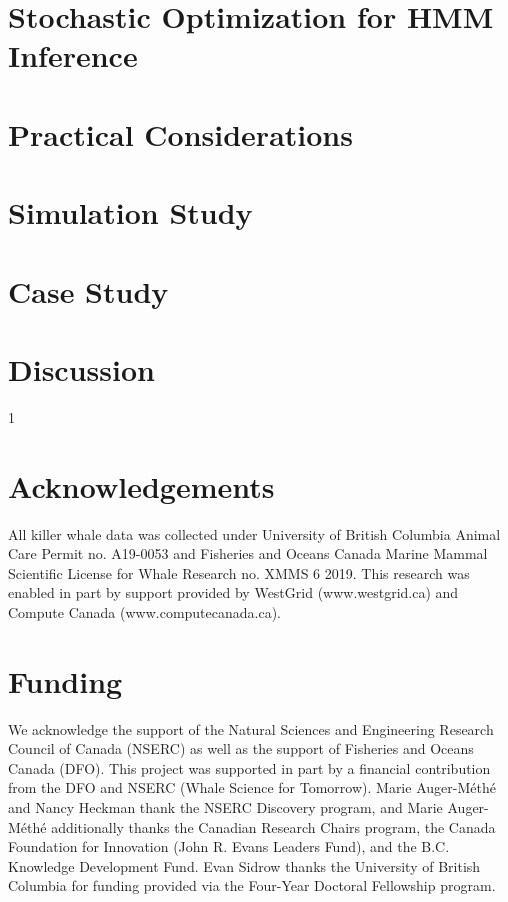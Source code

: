 \documentclass[12pt]{article}
\newcommand{\blind}{1}
\begin{document}
\section{Stochastic Optimization for HMM Inference}


\section{Practical Considerations}

\label{sec:prac}

\section{Simulation Study}


\section{Case Study}


\section{Discussion}


\blind
\section*{Acknowledgements}
All killer whale data was collected under University of British Columbia Animal Care Permit no. A19-0053 and Fisheries and Oceans Canada Marine Mammal Scientific License for Whale Research no. XMMS 6 2019.
This research was enabled in part by support provided by WestGrid (www.westgrid.ca) and Compute Canada (www.computecanada.ca).

\section*{Funding}
We acknowledge the support of the Natural Sciences and Engineering Research Council of Canada (NSERC) as well as the support of Fisheries and Oceans Canada (DFO). This project was supported in part by a financial contribution from the DFO and NSERC (Whale Science for Tomorrow).
Marie Auger-M\'eth\'e and Nancy Heckman thank the NSERC Discovery program, and Marie Auger-M\'eth\'e additionally thanks the Canadian Research Chairs program, the Canada Foundation for Innovation (John R. Evans Leaders Fund), and the B.C. Knowledge Development Fund.
Evan Sidrow thanks the University of British Columbia for funding provided via the Four-Year Doctoral Fellowship program.
\fi
\end{document}
